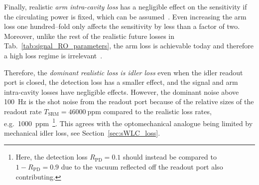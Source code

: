 Finally, realistic \emph{arm intra-cavity loss} has a negligible effect on the sensitivity if the circulating power is fixed, which can be assumed~\cite{}. Even increasing the arm loss one hundred--fold only affects the sensitivity by less than a factor of two. Moreover, unlike the rest of the realistic future losses in Tab.~\ref{tab:signal_RO_parameters}, the arm loss is achievable today and therefore a high loss regime is irrelevant~\cite{}. %

Therefore, the \emph{dominant realistic loss is idler loss} even when the idler readout port is closed, the detection loss has a smaller effect, and the signal and arm intra-cavity losses have negligible effects. However, the dominant noise above 100~Hz is the shot noise from the readout port because of the relative sizes of the readout rate $T_\text{SRM}=46000~\text{ppm}$ compared to the realistic loss rates, e.g.\ 1000~ppm~\footnote{Here, the detection loss $R_\text{PD}=0.1$ should instead be compared to $1-R_\text{PD}=0.9$ due to the vacuum reflected off the readout port also contributing.}. This agrees with the optomechanical analogue being limited by mechanical idler loss, see Section~\ref{sec:sWLC_loss}. 

